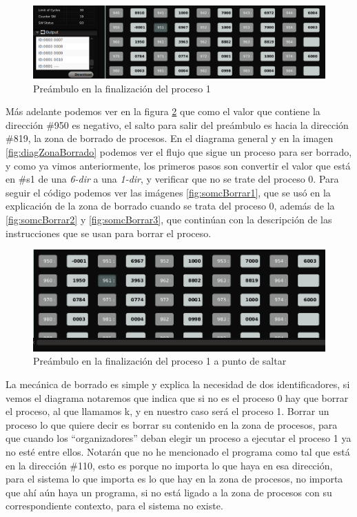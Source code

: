 \documentclass[letterpaper,12pt,oneside]{book}
\begin{document}
		
		\begin{figure}[h]		
			\centering
			\includegraphics[scale=0.4]{media/CARDIACC/proceso1FinishPream_cutted.png}
			\caption{ Preámbulo en la finalización del proceso 1}
			\label{fig:proceso1FinishPream}
		\end{figure}
		
		Más adelante podemos ver en la figura \ref{fig:proceso1FinishPream2} que como el valor que contiene la dirección \#950 es negativo, el salto
		para salir del preámbulo es hacia la dirección \#819, la zona de borrado de procesos. En el diagrama general y en la imagen \ref{fig:diagZonaBorrado} podemos
		ver el flujo que sigue un proceso para ser borrado, y como ya vimos anteriormente, los primeros pasos son convertir
		el valor que está en \#s1 de una \textit{6-dir} a una \textit{1-dir}, y verificar que no se trate del proceso 0. Para seguir
		el código podemos ver las imágenes \ref{fig:somcBorrar1}, que se usó en la explicación de la zona
		de borrado cuando se trata del proceso 0, además de la \ref{fig:somcBorrar2} y \ref{fig:somcBorrar3}, que
		continúan con la descripción de las instrucciones que se usan para 
		borrar el proceso.
		
		
		\begin{figure}[h]		
			\centering
			\includegraphics[scale=0.4]{media/CARDIACC/proceso1FinishPream2_cut.png}
			\caption{ Preámbulo en la finalización del proceso 1 a punto de saltar}
			\label{fig:proceso1FinishPream2}
		\end{figure}
		
		La mecánica de borrado es simple y explica la necesidad de dos identificadores, si vemos el diagrama notaremos que indica que si
		no es el proceso 0 hay que borrar el proceso, al que llamamos k, y en nuestro caso será el proceso 1. Borrar un proceso lo que quiere decir es
		borrar su contenido en la zona de procesos, para que cuando los ``organizadores''  deban elegir un proceso a ejecutar el proceso 1 ya no esté entre ellos.
		Notarán que no he mencionado el programa como tal que está en la dirección \#110, esto es porque no importa lo que haya en esa dirección, para el sistema
		lo que importa es lo que hay en la zona de procesos, no importa que ahí aún haya un programa, si no está ligado a la zona de procesos con su correspondiente
		contexto, para el sistema no existe.
		
\end{document}
